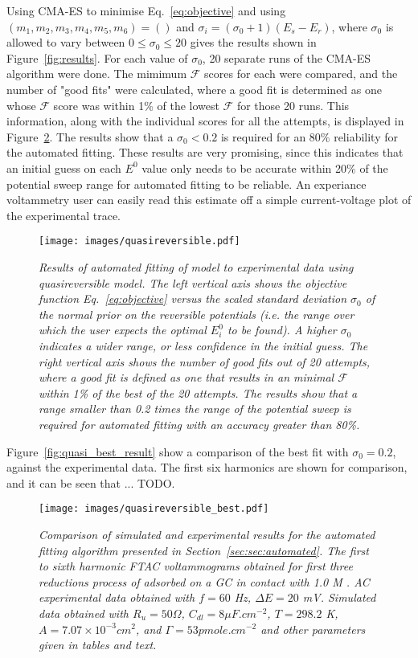 \documentclass[a4paper, 12pt]{article}
\begin{document}
Using CMA-ES to minimise Eq.~\ref{eq:objective} and using
$(m_1,m_2,m_3,m_4,m_5,m_6) = ()$ and $\sigma_i = (\sigma_0+1)(E_s-E_r)$, where
$\sigma_0$ is allowed to vary between $0 \le \sigma_0 \le 20$ gives the results
shown in Figure~\ref{fig:results}. For each value of $\sigma_0$, 20 separate
runs of the CMA-ES algorithm were done. The mimimum $\mathcal{F}$ scores for
each were compared, and the number of "good fits" were calculated, where a good
fit is determined as one whose $\mathcal{F}$ score was within 1\% of the lowest
$\mathcal{F}$ for those 20 runs. This information, along with the individual
scores for all the attempts, is displayed in Figure~\ref{fig:quasi_results}. The
results show that a $\sigma_0 < 0.2$ is required for an 80\% reliability for the
automated fitting. These results are very promising, since this indicates that
an initial guess on each $E^0$ value only needs to be accurate within 20\% of
the potential sweep range for automated fitting to be reliable. An experiance
voltammetry user can easily read this estimate off a simple current-voltage plot
of the experimental trace.

\begin{figure}[h]
\texttt{[image: images/quasireversible.pdf]}
    \caption{\it{Results of automated fitting of model to experimental data
    using quasireversible model. The left vertical axis shows the objective
    function Eq.~\ref{eq:objective} versus the scaled standard deviation
    $\sigma_0$ of the normal prior on the reversible potentials (i.e. the range
    over which the user expects the optimal $E^0_i$ to be found). A higher
    $\sigma_0$ indicates a wider range, or less confidence in the initial guess.
    The right vertical axis shows the number of good fits out of 20 attempts,
    where a good fit is defined as one that results in an minimal $\mathcal{F}$
    within 1\% of the best of the 20 attempts. The results show that a range
    smaller than 0.2 times the range of the potential sweep is required for
    automated fitting with an accuracy greater than 80\%.}}
    \label{fig:quasi_results}
\end{figure}

Figure~\ref{fig:quasi_best_result} show a comparison of the best fit with
$\sigma_0=0.2$, against the experimental data. The first six harmonics are shown
for comparison, and it can be seen that ... TODO.

\begin{figure}[h]
\texttt{[image: images/quasireversible\_best.pdf]}
    \caption{\it{Comparison of simulated and experimental results for the
    automated fitting algorithm presented in Section~\ref{sec:sec:automated}.
    The first to sixth harmonic FTAC voltammograms obtained for first three
    reductions process of  adsorbed on a GC in contact with
    1.0 M . AC experimental data obtained with $f = 60$ Hz, $\Delta E
    = 20$ mV. Simulated data obtained with $R_u = 50 \Omega$, $C_{dl} = 8 \mu
    F.cm^{-2}$, $T = 298.2$ K, $A = 7.07 \times 10^{-3} cm^2$, and $\Gamma = 53
    pmole.cm^{-2}$ and other parameters given in tables and text.}}
    \label{fig:quasi_results}
\end{figure}
\end{document}
